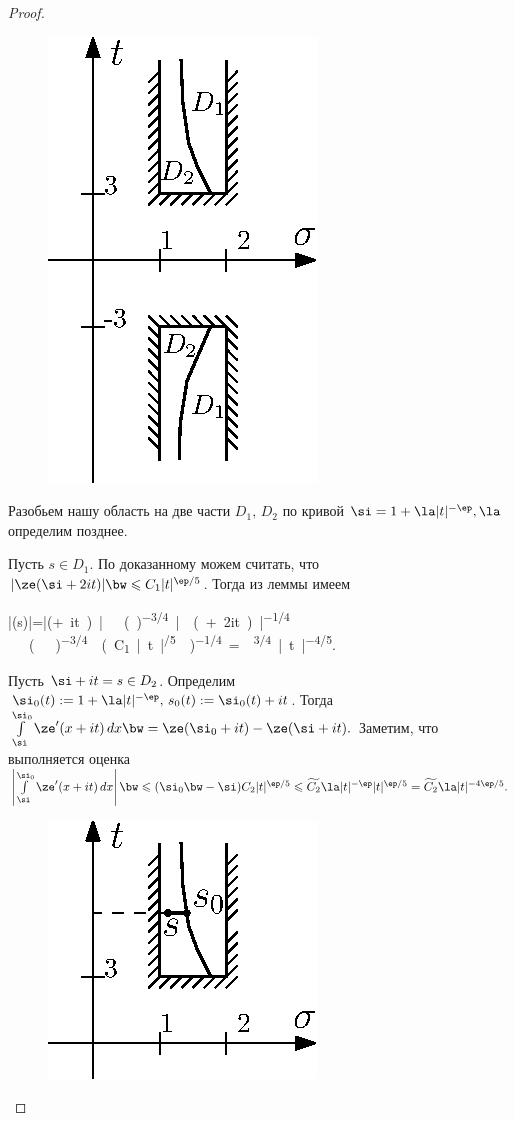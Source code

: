 \begin{proof}
  \begin{figure}
    \vskip -40pt
    \includegraphics[scale=1.0]{0402}
  \end{figure}

  Разобьем нашу область на две части $D_1,\,D_2$ по кривой $\si=1+\la|t|^{-\ep}, \la$ определим позднее.

   Пусть $s\in D_1$. По доказанному можем считать, что $|\ze(\si+2it)| \bw\leqslant C_1|t|^{\ep/5}$. Тогда из леммы имеем
  \begin{mlc*}
    |\ze(s)|=|\ze(\si+it)|\ge\ze(\si)^{-3/4}|\ze(\si+2it)|^{-1/4}\ge\\\ge
    \left(\right)^{-3/4}\left(C_1|t|^{\ep/5}\right)^{-1/4}=\la^{3/4}|t|^{-{4\ep}/5}.
  \end{mlc*}

   Пусть $\si+it=s\in D_2$. Определим $\si_0(t):=1+\la|t|^{-\ep},\,s_0(t):=\si_0(t)+it$.
  Тогда $\intlim_\si^{\si_0}\ze'(x+it)\,dx\bw=\ze(\si_0+it)-\ze(\si+it).$ Заметим, что выполняется оценка
  $\left|\intlim_\si^{\si_0}\ze'(x+it)\,dx\right|\bw\leqslant(\si_0\bw-\si)C_2|t|^{\ep/5}\leqslant\widetilde{C_2}\la|t|^{-\ep}|t|^{\ep/5}=\widetilde{C_2}\la|t|^{-4\ep/5}.$

  \begin{figure}
    \vskip -50pt
    \includegraphics[scale=1.0]{0403}
  \end{figure}


\end{proof}
